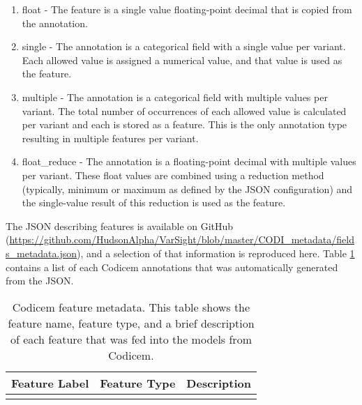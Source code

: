 \documentclass{article}
\begin{document}
\begin{enumerate}
\item float - The feature is a single value floating-point decimal that is copied from the annotation.
\item single - The annotation is a categorical field with a single value per variant.  Each allowed value is assigned a numerical value, and that value is used as the feature.
\item multiple - The annotation is a categorical field with multiple values per variant.  The total number of occurrences of each allowed value is calculated per variant and each is stored as a feature.  This is the only annotation type resulting in multiple features per variant.
\item float\_reduce - The annotation is a floating-point decimal with multiple values per variant.  These float values are combined using a reduction method (typically, minimum or maximum as defined by the JSON configuration) and the single-value result of this reduction is used as the feature.  
\end{enumerate}

The JSON describing features is available on GitHub (\url{https://github.com/HudsonAlpha/VarSight/blob/master/CODI_metadata/fields_metadata.json}), and a selection of that information is reproduced here.  Table \ref{tab:features} contains a list of each Codicem annotations that was automatically generated from the JSON.

\begin{longtable}{p{.20\linewidth}|p{.20\linewidth}|p{.50\linewidth}}
\textbf{Feature Label}&\textbf{Feature Type}&\textbf{Description} \\ \hline
\endhead

\caption{Codicem feature metadata.  This table shows the feature name, feature type, and a brief description of each feature that was fed into the models from Codicem.}
\label{tab:features}
\end{longtable}
\end{document}
